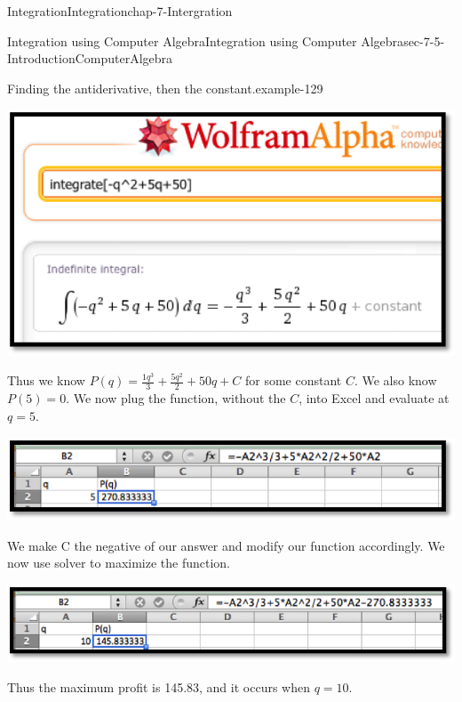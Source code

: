 \documentclass[oneside,10pt,]{book}
\numberwithin{equation}{section}
\begin{document}
\begin{chapterptx}{Integration}{}{Integration}{}{}{chap-7-Intergration}
\begin{sectionptx}{Integration using Computer Algebra}{}{Integration using Computer Algebra}{}{}{sec-7-5-IntroductionComputerAlgebra}
\begin{example}{Finding the antiderivative, then the constant.}{example-129}
\begin{sidebyside}{1}{0.15}{0.15}{0}
\begin{sbspanel}{0.7}
\includegraphics[width=1\linewidth]{images/sec7-5-14.png}
\end{sbspanel}%
\end{sidebyside}%
\par
\hypertarget{p-2900}{}%
Thus we know \(P(q)=\frac{1q^3}{3}+\frac{5q^2}{2}+50q+C\) for some constant \(C\).  We also know \(P(5)=0\).  We now plug the function, without the \(C\), into Excel and evaluate at \(q=5\).%
\begin{sidebyside}{1}{0.15}{0.15}{0}%
\begin{sbspanel}{0.7}%
\includegraphics[width=1\linewidth]{images/sec7-5-15.png}
\end{sbspanel}%
\end{sidebyside}%
\par
\hypertarget{p-2901}{}%
We make C the negative of our answer and modify our function accordingly.  We now use solver to maximize the function.%
\begin{sidebyside}{1}{0.15}{0.15}{0}%
\begin{sbspanel}{0.7}%
\includegraphics[width=1\linewidth]{images/sec7-5-16.png}
\end{sbspanel}%
\end{sidebyside}%
\par
\hypertarget{p-2902}{}%
Thus the maximum profit is \textdollar{}145.83, and it occurs when \(q=10\).%

\end{example}
\end{sectionptx}
\end{chapterptx}
\end{document}
